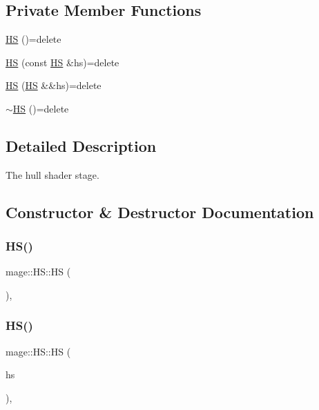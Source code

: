 \subsection*{Private Member Functions}
\begin{DoxyCompactItemize}
\item 
\hyperlink{structmage_1_1_h_s_a0e7ba5d3c3373d3e7eebb9772c5d44bd}{HS} ()=delete
\item 
\hyperlink{structmage_1_1_h_s_a750e79a2363cfa6ecb6501d69c69f682}{HS} (const \hyperlink{structmage_1_1_h_s}{HS} \&hs)=delete
\item 
\hyperlink{structmage_1_1_h_s_a072a6a31da9dbfb9bb7ef3a87aff30fa}{HS} (\hyperlink{structmage_1_1_h_s}{HS} \&\&hs)=delete
\item 
\hyperlink{structmage_1_1_h_s_a035e80d381c4a059d94978280f95faf9}{$\sim$\+HS} ()=delete
\end{DoxyCompactItemize}


\subsection{Detailed Description}
The hull shader stage. 

\subsection{Constructor \& Destructor Documentation}
\hypertarget{structmage_1_1_h_s_a0e7ba5d3c3373d3e7eebb9772c5d44bd}{}\label{structmage_1_1_h_s_a0e7ba5d3c3373d3e7eebb9772c5d44bd} 
\subsubsection{\texorpdfstring{H\+S()}{HS()}\hspace{0.1cm}{\footnotesize\ttfamily [1/3]}}
{\footnotesize\ttfamily mage\+::\+H\+S\+::\+HS (\begin{DoxyParamCaption}{ }\end{DoxyParamCaption})\hspace{0.3cm}{\ttfamily [private]}, {\ttfamily [delete]}}

\hypertarget{structmage_1_1_h_s_a750e79a2363cfa6ecb6501d69c69f682}{}\label{structmage_1_1_h_s_a750e79a2363cfa6ecb6501d69c69f682} 
\subsubsection{\texorpdfstring{H\+S()}{HS()}\hspace{0.1cm}{\footnotesize\ttfamily [2/3]}}
{\footnotesize\ttfamily mage\+::\+H\+S\+::\+HS (\begin{DoxyParamCaption}\item[{const \hyperlink{structmage_1_1_h_s}{HS} \&}]{hs }\end{DoxyParamCaption})\hspace{0.3cm}{\ttfamily [private]}, {\ttfamily [delete]}}

